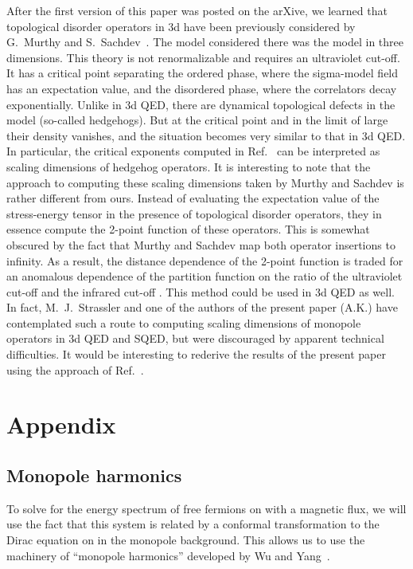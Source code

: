 \documentclass[a4paper,12pt, amsfonts, amssymb]{article}
\providecommand{\CC}{{\mathbb C}}
\providecommand{\RR}{{\mathbb R}}
\providecommand{\PP}{{\mathbb P}}
\begin{document}
After the first version of this paper was posted on the arXive, we learned that topological disorder operators in 3d have
been previously considered by G.~Murthy and S.~Sachdev~\cite{MurthySachdev}. The model considered there was the \myHighlight{$\CC\PP^N$}\coordHE{} model
in three dimensions. This theory is not renormalizable and requires an ultraviolet cut-off. It has a critical point 
separating the ordered phase, where the sigma-model field has an expectation value, and the disordered phase, where
the correlators decay exponentially. Unlike in 3d QED, there are dynamical topological defects in the \myHighlight{$\CC\PP^N$}\coordHE{} model
(so-called hedgehogs). But at the critical point and in the limit of large \coordHE{} their density vanishes, and the situation
becomes very similar to that in 3d QED. In particular, the critical exponents computed in Ref.~\cite{MurthySachdev}
can be interpreted as scaling dimensions of hedgehog operators. It is interesting to note that the approach
to computing these scaling dimensions taken by Murthy and Sachdev is rather different from ours. Instead of evaluating
the expectation value of the stress-energy tensor in the presence of topological disorder operators, they in essence
compute the 2-point function of these operators. This is somewhat obscured by the fact that Murthy and Sachdev
map both operator insertions to infinity. As a result, the distance dependence of the 2-point function is traded for
an anomalous dependence of the partition function on the ratio of the ultraviolet cut-off \myHighlight{$\Lambda$}\coordHE{} and the infrared cut-off
\myHighlight{$\Delta$}\coordHE{}. This method could be used in 3d QED as well. In fact, M.~J.~Strassler and one of the authors of the present
paper (A.K.) have contemplated such a route to computing scaling dimensions of monopole operators in 3d QED and SQED, 
but were discouraged by apparent technical difficulties. It would be interesting to rederive the results of the
present paper using the approach of Ref.~\cite{MurthySachdev}.


\section*{Appendix}


\subsection*{Monopole harmonics}

To solve for the energy spectrum of free fermions on \coordHE{} with
a magnetic flux, we will use the fact that this system is related by a conformal transformation to the Dirac equation on \myHighlight{$\RR^3$}\coordHE{} in the monopole background. This allows us to use the machinery of ``monopole harmonics'' developed by Wu and Yang~\cite{WY}. 
\end{document}
